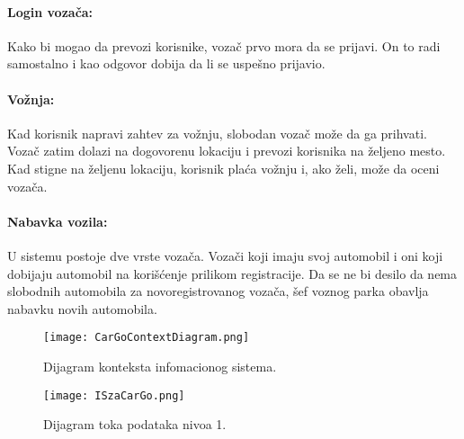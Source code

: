 \paragraph{Login vozača:}
    Kako bi mogao da prevozi korisnike, vozač prvo mora da se prijavi. On to radi samostalno i kao odgovor dobija da li se uspešno prijavio.
\paragraph{Vožnja:}
    Kad korisnik napravi zahtev za vožnju, slobodan vozač može da ga prihvati. Vozač zatim dolazi na dogovorenu lokaciju i prevozi korisnika na željeno mesto. Kad stigne na željenu lokaciju, korisnik plaća vožnju i, ako želi, može da oceni vozača.
\paragraph{Nabavka vozila:}
    U sistemu postoje dve vrste vozača. Vozači koji imaju svoj automobil i oni koji dobijaju automobil na korišćenje prilikom registracije. Da se ne bi desilo da nema slobodnih automobila za novoregistrovanog vozača, šef voznog parka obavlja nabavku novih automobila.

\begin{figure}[H]
\begin{center}
\texttt{[image: CarGoContextDiagram.png]}
\end{center}
    \caption{Dijagram konteksta infomacionog sistema.}
\label{fig:CarGoContextDiagram}
\end{figure}

\begin{figure}[H]
\begin{center}
\texttt{[image: ISzaCarGo.png]}
\end{center}
    \caption{Dijagram toka podataka nivoa 1.}
\label{fig:dtp1}
\end{figure}

